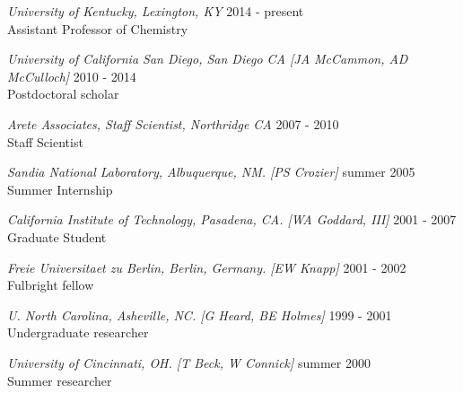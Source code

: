 \documentclass{res} %
\newenvironment{packed_item}{
\begin{itemize}
  \setlength{\itemsep}{1pt}
  \setlength{\parskip}{0pt}
  \setlength{\parsep}{0pt}
}{\end{itemize}}
\newcommand\lbi{\begin{packed_item}}
\newcommand\lei{\end{packed_item}}
\begin{document}
\begin{resume}
\vspace{8pt} %

{\sl University of Kentucky, Lexington, KY } \hfill 2014 - present\\ 
Assistant Professor of Chemistry


{\sl University of California San Diego,  San
Diego CA [JA
McCammon, AD McCulloch] } \hfill 2010 - 2014\\ 
Postdoctoral scholar

{\sl Arete Associates, Staff Scientist, Northridge CA} \hfill 	2007 - 2010\\
Staff Scientist

{\sl Sandia National Laboratory, Albuquerque, NM.  [PS Crozier]} \hfill 	summer 2005\\
Summer Internship

{\sl California Institute of Technology, Pasadena, CA.  [WA Goddard, III]	 } \hfill 2001 - 2007\\
Graduate Student

{\sl Freie Universitaet zu Berlin, Berlin, Germany.  [EW Knapp]} \hfill 2001 - 2002\\
Fulbright fellow

{\sl U. North Carolina, Asheville, NC.  [G Heard, BE Holmes]	} \hfill 1999 - 2001\\
Undergraduate researcher

{\sl University of Cincinnati, OH.  [T Beck, W Connick]} \hfill 	summer 2000 \\
Summer researcher 



\end{resume}
\end{document}
